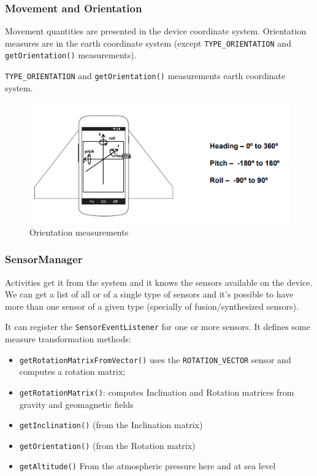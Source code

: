 \subsubsection{Movement and Orientation}
Movement quantities are presented in the device coordinate system.
Orientation measures are in the earth coordinate system (except
\texttt{TYPE\_ORIENTATION} and \texttt{getOrientation()} measurements).

\texttt{TYPE\_ORIENTATION} and \texttt{getOrientation()} measurements earth coordinate system.

\begin{figure}[h]
\centering
\includegraphics[width=0.8\linewidth]{figures/07_orientation_measurements.png}
\caption{Orientation measurements}
\label{fig:orientation_measurements}
\end{figure}

\subsubsection{SensorManager}

Activities get it from the system and it knows the sensors available on the device.
We can get a list of all or of a single type of sensors and it's possible to have more than one sensor of a given type
(specially of fusion/synthesized sensors). 

It can register the \texttt{SensorEventListener} for one or
more sensors. 
It defines some measure transformation methods: 
\begin{itemize}
    \item \texttt{getRotationMatrixFromVector()} uses the \texttt{ROTATION\_VECTOR} 
sensor and computes a rotation matrix;
    \item \texttt{getRotationMatrix()}: computes Inclination and Rotation matrices from gravity and
geomagnetic fields
\item \texttt{getInclination()} (from the Inclination matrix)
\item \texttt{getOrientation()} (from the Rotation matrix)
\item \texttt{getAltitude()}  From the atmospheric pressure here and at sea level

\end{itemize}

